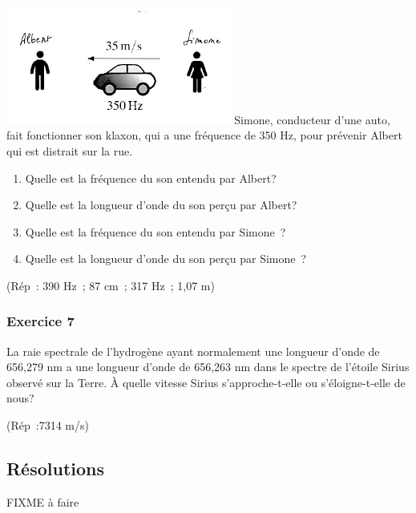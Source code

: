 \includegraphics[width=7.4cm,height=3.882cm]{Pictures/10000001000001A1000000DB0C45621DF12277A1.png}
Simone, conducteur d'une auto, fait fonctionner son klaxon, qui a une fréquence de
350 Hz, pour prévenir Albert qui est distrait sur la rue.
\begin{enumerate}
	\item Quelle est la fréquence du son entendu par Albert?
	\item Quelle est la longueur d'onde du son perçu par Albert?
	\item Quelle est la fréquence du son entendu par Simone~?
	\item Quelle est la longueur d'onde du son perçu par Simone~?
\end{enumerate}

(Rép~: 390 Hz~; 87 cm~; 317 Hz~; 1,07 m)

\subsubsection{Exercice 7}

La raie spectrale de l'hydrogène ayant normalement une longueur d'onde
de 656,279 nm a une longueur d'onde de 656,263 nm dans le spectre de
l'étoile Sirius observé sur la Terre. À quelle vitesse Sirius
s'approche-t-elle ou s'éloigne-t-elle de nous?

(Rép~:7314 m/s)

\subsection{Résolutions}

FIXME à faire